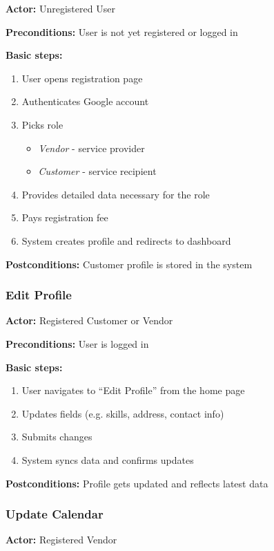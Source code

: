\documentclass[11pt,a4paper]{article}
\begin{document}
\textbf{Actor:} Unregistered User

\noindent \textbf{Preconditions:} User is not yet registered or logged in

\noindent \textbf{Basic steps:}
\begin{enumerate}[noitemsep]
  \item User opens registration page
  \item Authenticates Google account
  \item Picks role
    \begin{itemize}[noitemsep]
      \item \textit{Vendor} - service provider
      \item \textit{Customer} - service recipient
    \end{itemize}
  \item Provides detailed data necessary for the role
  \item Pays registration fee
  \item System creates profile and redirects to dashboard
\end{enumerate}

\noindent \textbf{Postconditions:} Customer profile is stored in the system

\subsubsection{Edit Profile}

\textbf{Actor:} Registered Customer or Vendor

\noindent \textbf{Preconditions:} User is logged in

\noindent \textbf{Basic steps:}
\begin{enumerate}
  \item User navigates to ``Edit Profile'' from the home page
  \item Updates fields (e.g. skills, address, contact info)
  \item Submits changes
  \item System syncs data and confirms updates
\end{enumerate}

\noindent \textbf{Postconditions:} Profile gets updated and reflects latest data

\subsubsection{Update Calendar}

\textbf{Actor:} Registered Vendor
\end{document}

